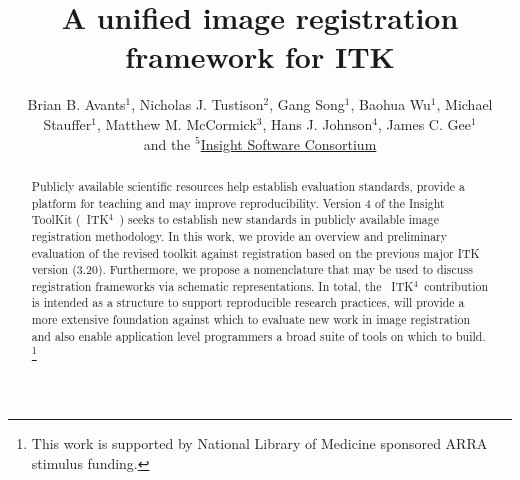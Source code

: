 \documentclass{llncs}
\newcommand{\tk}{~ITK$^{\text{4}}$~}
\begin{document}
\vspace{-0.1in}
\title{A unified image registration framework for ITK}
\author{Brian B. Avants$^1$, Nicholas J. Tustison$^2$, Gang Song$^1$, Baohua Wu$^1$,
  Michael Stauffer$^1$, Matthew M. McCormick$^3$, Hans J. Johnson$^4$,
  James C. Gee$^1$ \\and the
  $^5$\href{http://www.insightsoftwareconsortium.org/}{Insight Software Consortium}}
\maketitle              
\begin{abstract}
Publicly available scientific resources help establish evaluation
standards, provide a platform for teaching and may improve reproducibility.
Version 4 of the Insight ToolKit (\tk) seeks to establish new
standards in publicly available image registration methodology.  In this
work, we provide an overview and preliminary evaluation of the revised
toolkit against registration based on the previous major ITK version
(3.20).  Furthermore, we propose a nomenclature that may be used to
discuss registration frameworks via schematic representations.  In
total, the \tk contribution is intended as a structure to support
reproducible research practices, will provide a more extensive
foundation against which to evaluate new work in image registration
and also enable application level programmers a broad suite of tools
on which to build. \footnote{This
  work is supported by National Library of Medicine sponsored ARRA
  stimulus funding.}  
\end{abstract}
\end{document}
